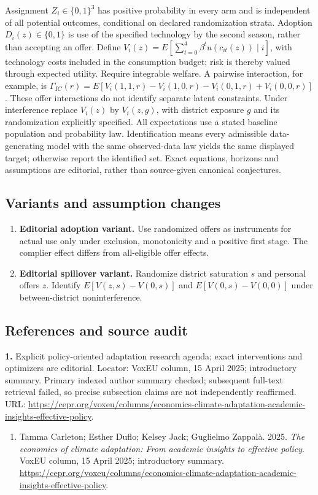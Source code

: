 \documentclass[11pt,a4paper]{article}
\begin{document}
Assignment \(Z_i\in\{0,1\}^3\) has positive probability in every arm and is independent of all potential outcomes, conditional on declared randomization strata. Adoption \(D_i(z)\in\{0,1\}\) is use of the specified technology by the second season, rather than accepting an offer. Define \(V_i(z)=E[\sum_{t=0}^{4}\beta^tu(c_{it}(z))\mid i]\), with technology costs included in the consumption budget; risk is thereby valued through expected utility. Require integrable welfare. A pairwise interaction, for example, is \(\Gamma_{IC}(r)=E[V_i(1,1,r)-V_i(1,0,r)-V_i(0,1,r)+V_i(0,0,r)]\). These offer interactions do not identify separate latent constraints. Under interference replace \(V_i(z)\) by \(V_i(z,g)\), with district exposure \(g\) and its randomization explicitly specified. All expectations use a stated baseline population and probability law. Identification means every admissible data-generating model with the same observed-data law yields the same displayed target; otherwise report the identified set. Exact equations, horizons and assumptions are editorial, rather than source-given canonical conjectures.
\subsection*{Variants and assumption changes}
\begin{enumerate}
\item \textbf{Editorial adoption variant.} Use randomized offers as instruments for actual use only under exclusion, monotonicity and a positive first stage. The complier effect differs from all-eligible offer effects.
\item \textbf{Editorial spillover variant.} Randomize district saturation \(s\) and personal offers \(z\). Identify \(E[V(z,s)-V(0,s)]\) and \(E[V(0,s)-V(0,0)]\) under between-district noninterference.
\end{enumerate}
\subsection*{References and source audit}
\textbf{1.} Explicit policy-oriented adaptation research agenda; exact interventions and optimizers are editorial. Locator: VoxEU column, 15 April 2025; introductory summary. Primary indexed author summary checked; subsequent full-text retrieval failed, so precise subsection claims are not independently reaffirmed. URL: \url{https://cepr.org/voxeu/columns/economics-climate-adaptation-academic-insights-effective-policy}.
\begin{enumerate}\raggedright
\item\hypertarget{definitions:source:30007716:1}{} Tamma Carleton; Esther Duflo; Kelsey Jack; Guglielmo Zappalà. 2025. \emph{The economics of climate adaptation: From academic insights to effective policy}. VoxEU column, 15 April 2025; introductory summary.
\url{https://cepr.org/voxeu/columns/economics-climate-adaptation-academic-insights-effective-policy}.
\end{enumerate}
\end{document}
